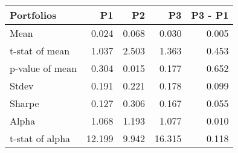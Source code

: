 \begin{tabular}{lrrrr}
\toprule
Portfolios & P1 & P2 & P3 & P3 - P1 \\
\midrule
Mean & 0.024 & 0.068 & 0.030 & 0.005 \\
t-stat of mean & 1.037 & 2.503 & 1.363 & 0.453 \\
p-value of mean & 0.304 & 0.015 & 0.177 & 0.652 \\
Stdev & 0.191 & 0.221 & 0.178 & 0.099 \\
Sharpe & 0.127 & 0.306 & 0.167 & 0.055 \\
Alpha & 1.068 & 1.193 & 1.077 & 0.010 \\
t-stat of alpha & 12.199 & 9.942 & 16.315 & 0.118 \\
\bottomrule
\end{tabular}
